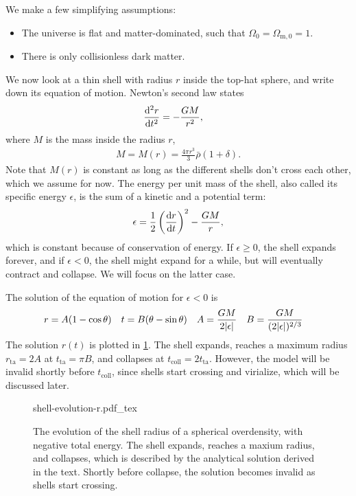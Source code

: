 We make a few simplifying assumptions:
\begin{itemize}
	\item The universe is flat and matter-dominated, such that $\Omega_0 = \Omega_{\text{m}, 0} = 1$.
	\item There is only collisionless dark matter.
\end{itemize}
We now look at a thin shell with radius $r$ inside the top-hat sphere, and write down its equation of motion. Newton's second law states
\begin{align*}
	\dv[2]{r}{t}
	&= - \frac{G M}{r^2},
\end{align*}
where $M$ is the mass inside the radius $r$,
\begin{align*}
	M = M(r) = \frac{4\pi r^3}{3} \bar{\rho}(1+\delta).
\end{align*}
Note that $M(r)$ is constant as long as the different shells don't cross each other, which we assume for now.
The energy per unit mass of the shell, also called its specific energy $\epsilon$, is the sum of a kinetic and a potential term:
\begin{align*}
	\epsilon = \frac{1}{2} \left( \dv{r}{t} \right)^2
	- \frac{G M}{r},
\end{align*}
which is constant because of conservation of energy.
If $\epsilon \geq 0$, the shell expands forever, and if $\epsilon < 0$, the shell might expand for a while, but will eventually contract and collapse. We will focus on the latter case.

The solution of the equation of motion for $\epsilon < 0$ is
\begin{align*}
	r &= A(1- \cos \theta) &
	t &= B(\theta - \sin\theta) &
	A &= \frac{GM}{2 \vert\epsilon\vert} &
	B &= \frac{GM}{(2 \vert\epsilon\vert)^{2/3}}
\end{align*}
The solution $r(t)$ is plotted in \cref{fig:shell-collapse-r}.
The shell expands, reaches a maximum radius $r_\text{ta} = 2 A$ at $t_\text{ta} = \pi B$, and collapses at $t_\text{coll} = 2 t_\text{ta}$.
However, the model will be invalid shortly before $t_\text{coll}$, since shells start crossing and virialize, which will be discussed later.
\begin{figure}
	\centering
	{shell-evolution-r.pdf_tex}
	\caption{The evolution of the shell radius of a spherical overdensity, with negative total energy. The shell expands, reaches a maxium radius, and collapses, which is described by the analytical solution derived in the text. Shortly before collapse, the solution becomes invalid as shells start crossing.}
	\label{fig:shell-collapse-r}
\end{figure}



